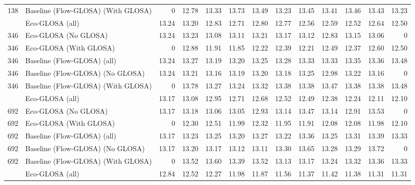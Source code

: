 \begin{table}[ht]
{\begin{tabular}{llrrrrrrrrrrr}
        138  & Baseline (Flow-GLOSA) (With GLOSA) & 0     & 12.78 & 13.33 & 13.73 & 13.49 & 13.23 & 13.45 & 13.41 & 13.46 & 13.43 & 13.23 \\
        \addlinespace
        346  & Eco-GLOSA (all)                    & 13.24 & 13.20 & 12.83 & 12.71 & 12.80 & 12.77 & 12.56 & 12.59 & 12.52 & 12.64 & 12.50 \\
        346  & Eco-GLOSA (No GLOSA)               & 13.24 & 13.23 & 13.08 & 13.11 & 13.21 & 13.17 & 13.12 & 12.83 & 13.15 & 13.06 & 0     \\
        346  & Eco-GLOSA (With GLOSA)             & 0     & 12.88 & 11.91 & 11.85 & 12.22 & 12.39 & 12.21 & 12.49 & 12.37 & 12.60 & 12.50 \\
        346  & Baseline (Flow-GLOSA) (all)        & 13.24 & 13.27 & 13.19 & 13.20 & 13.25 & 13.28 & 13.33 & 13.33 & 13.35 & 13.36 & 13.48 \\
        346  & Baseline (Flow-GLOSA) (No GLOSA)   & 13.24 & 13.21 & 13.16 & 13.19 & 13.20 & 13.18 & 13.25 & 12.98 & 13.22 & 13.16 & 0     \\
        346  & Baseline (Flow-GLOSA) (With GLOSA) & 0     & 13.78 & 13.27 & 13.24 & 13.32 & 13.38 & 13.38 & 13.47 & 13.38 & 13.38 & 13.48 \\
        \addlinespace
        692  & Eco-GLOSA (all)                    & 13.17 & 13.08 & 12.95 & 12.71 & 12.68 & 12.52 & 12.49 & 12.38 & 12.24 & 12.11 & 12.10 \\
        692  & Eco-GLOSA (No GLOSA)               & 13.17 & 13.18 & 13.06 & 13.05 & 12.93 & 13.14 & 13.47 & 13.14 & 12.91 & 13.53 & 0     \\
        692  & Eco-GLOSA (With GLOSA)             & 0     & 12.30 & 12.51 & 11.99 & 12.32 & 11.95 & 11.91 & 12.08 & 12.08 & 11.98 & 12.10 \\
        692  & Baseline (Flow-GLOSA) (all)        & 13.17 & 13.23 & 13.25 & 13.20 & 13.27 & 13.22 & 13.36 & 13.25 & 13.31 & 13.39 & 13.33 \\
        692  & Baseline (Flow-GLOSA) (No GLOSA)   & 13.17 & 13.20 & 13.17 & 13.12 & 13.11 & 13.30 & 13.65 & 13.28 & 13.29 & 13.72 & 0     \\
        692  & Baseline (Flow-GLOSA) (With GLOSA) & 0     & 13.52 & 13.60 & 13.39 & 13.52 & 13.13 & 13.17 & 13.24 & 13.32 & 13.36 & 13.33 \\
        \addlinespace
        1385 & Eco-GLOSA (all)                    & 12.84 & 12.52 & 12.27 & 11.98 & 11.87 & 11.56 & 11.37 & 11.42 & 11.38 & 11.31 & 11.31 \\

\end{tabular}}
\end{table}
